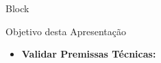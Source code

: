 \begin{frame}{Block}
  \begin{block}{Objetivo desta Apresentação}
    \begin{itemize}
      \item \textbf{Validar Premissas Técnicas:} 
    \end{itemize}
  \end{block}
\end{frame}

